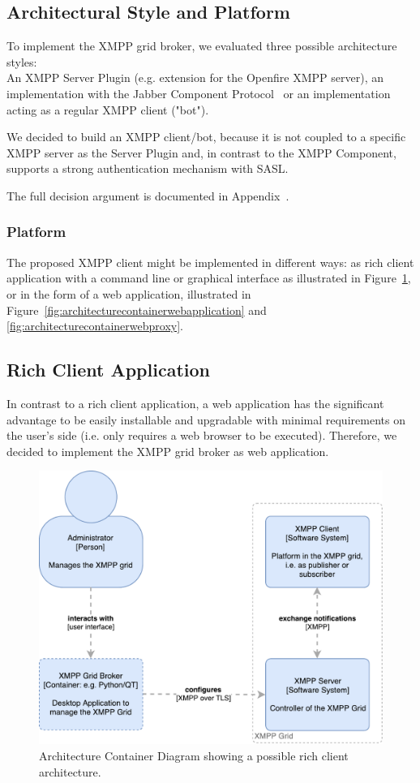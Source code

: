 \subsection{Architectural Style and Platform}

To implement the XMPP grid broker, we evaluated three possible architecture styles:\hfill\\
An XMPP Server Plugin (e.g. extension for the Openfire XMPP server), an implementation with the Jabber Component Protocol~\cite{xep-0114} or an implementation acting as a regular XMPP client ("bot").

We decided to build an XMPP client/bot, because it is not coupled to a specific XMPP server as the Server Plugin and, in contrast to the XMPP Component, supports a strong authentication mechanism with SASL.

The full decision argument is documented in Appendix~.

\subsubsection{Platform}

The proposed XMPP client might be implemented in different ways: as rich client application with a command line or graphical interface as illustrated in Figure~\ref{fig:architecturecontainerrichclient}, or in the form of a web application, illustrated in Figure~\ref{fig:architecturecontainerwebapplication} and \ref{fig:architecturecontainerwebproxy}.

\subsection{Rich Client Application}

In contrast to a rich client application, a web application has the significant advantage to be easily installable and upgradable with minimal requirements on the user's side (i.e. only requires a web browser to be executed).
Therefore, we decided to implement the XMPP grid broker as web application.

\begin{figure}[h]
\centering
\includegraphics[width=0.7\linewidth]{resources/architecture_container_rich_client}
\caption[Architecture Container Diagram: Rich Client]{Architecture Container Diagram showing a possible rich client architecture.}
\label{fig:architecturecontainerrichclient}
\end{figure}

